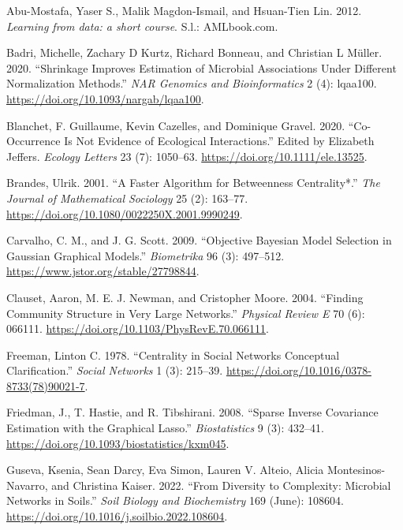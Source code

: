 \documentclass[
  letterpaper,
  DIV=11,
  numbers=noendperiod]{scrartcl}
\newlength{\cslhangindent}
\newlength{\cslentryspacingunit} %
\newenvironment{CSLReferences}[2] %
 {%
  \setlength{\parindent}{0pt}
  \ifodd #1
  \let\oldpar\par
  \def\par{\hangindent=\cslhangindent\oldpar}
  \fi
  \setlength{\parskip}{#2\cslentryspacingunit}
 }%
 {}
\begin{document}
\hypertarget{refs}{}
\begin{CSLReferences}{1}{0}
\leavevmode{}%
Abu-Mostafa, Yaser S., Malik Magdon-Ismail, and Hsuan-Tien Lin. 2012.
\emph{Learning from data: a short course}. S.l.: AMLbook.com.

\leavevmode{}%
Badri, Michelle, Zachary D Kurtz, Richard Bonneau, and Christian L
Müller. 2020. {``Shrinkage Improves Estimation of Microbial Associations
Under Different Normalization Methods.''} \emph{NAR Genomics and
Bioinformatics} 2 (4): lqaa100.
\url{https://doi.org/10.1093/nargab/lqaa100}.

\leavevmode{}%
Blanchet, F. Guillaume, Kevin Cazelles, and Dominique Gravel. 2020.
{``Co{-}Occurrence Is Not Evidence of Ecological Interactions.''} Edited
by Elizabeth Jeffers. \emph{Ecology Letters} 23 (7): 1050--63.
\url{https://doi.org/10.1111/ele.13525}.

\leavevmode{}%
Brandes, Ulrik. 2001. {``A Faster Algorithm for Betweenness
Centrality*.''} \emph{The Journal of Mathematical Sociology} 25 (2):
163--77. \url{https://doi.org/10.1080/0022250X.2001.9990249}.

\leavevmode{}%
Carvalho, C. M., and J. G. Scott. 2009. {``Objective Bayesian Model
Selection in Gaussian Graphical Models.''} \emph{Biometrika} 96 (3):
497--512. \url{https://www.jstor.org/stable/27798844}.

\leavevmode{}%
Clauset, Aaron, M. E. J. Newman, and Cristopher Moore. 2004. {``Finding
Community Structure in Very Large Networks.''} \emph{Physical Review E}
70 (6): 066111. \url{https://doi.org/10.1103/PhysRevE.70.066111}.

\leavevmode{}%
Freeman, Linton C. 1978. {``Centrality in Social Networks Conceptual
Clarification.''} \emph{Social Networks} 1 (3): 215--39.
\url{https://doi.org/10.1016/0378-8733(78)90021-7}.

\leavevmode{}%
Friedman, J., T. Hastie, and R. Tibshirani. 2008. {``Sparse Inverse
Covariance Estimation with the Graphical Lasso.''} \emph{Biostatistics}
9 (3): 432--41. \url{https://doi.org/10.1093/biostatistics/kxm045}.

\leavevmode{}%
Guseva, Ksenia, Sean Darcy, Eva Simon, Lauren V. Alteio, Alicia
Montesinos-Navarro, and Christina Kaiser. 2022. {``From Diversity to
Complexity: Microbial Networks in Soils.''} \emph{Soil Biology and
Biochemistry} 169 (June): 108604.
\url{https://doi.org/10.1016/j.soilbio.2022.108604}.


\end{CSLReferences}
\end{document}
